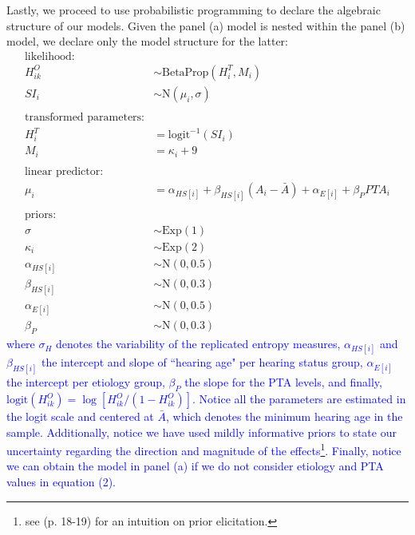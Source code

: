 Lastly, we proceed to use probabilistic programming to declare the algebraic structure of our models. Given the panel (a) model is nested within the panel (b) model, we declare only the model structure for the latter:
%
\begin{align}
	\text{likelihood:} & \nonumber \\
	H^{O}_{ik} & \sim \text{BetaProp} \left( H^{T}_{i}, M_{i} \right) \\ 
	SI_{i} & \sim \text{N} \left( \mu_{i}, \sigma \right) \\
	\nonumber \\
	\text{transformed parameters:} & \nonumber \\
	H^{T}_{i} &= \text{logit}^{-1}( SI_{i} ) \\
	M_{i} &= \kappa_{i} + 9 \\
	\nonumber \\
	\text{linear predictor:} & \nonumber \\
	\mu_{i} & = \alpha_{HS[i]} + \beta_{HS[i]} (A_{i} - \bar{A}) + \alpha_{E[i]} + \beta_{P} PTA_{i} \\ 
	\nonumber \\
	\text{priors:} & \nonumber \\
	\sigma & \sim \text{Exp}(1) \\
	\kappa_{i} & \sim \text{Exp}(2) \\
	\alpha_{HS[i]} & \sim \text{N}(0, 0.5) \\
	\beta_{HS[i]} & \sim \text{N}(0 , 0.3) \\
	\alpha_{E[i]} & \sim \text{N}(0, 0.5) \\
	\beta_{P} & \sim \text{N}(0, 0.3)
\end{align}
%
\textcolor{blue}{where $\sigma_{H}$ denotes the variability of the replicated entropy measures, $\alpha_{HS[i]}$ and $\beta_{HS[i]}$ the intercept and slope of ``hearing age" per hearing status group, $\alpha_{E[i]}$ the intercept per etiology group, $\beta_{P}$ the slope for the PTA levels, and finally, $\text{logit}\left( H^{O}_{ik} \right) = \log \left[ H^{O}_{ik} / ( 1 - H^{O}_{ik} ) \right]$. Notice all the parameters are estimated in the logit scale and centered at $\bar{A}$, which denotes the minimum hearing age in the sample. Additionally, notice we have used mildly informative priors to state our uncertainty regarding the direction and magnitude of the effects\footnote{see \citet{Rivera_2021} (p. 18-19) for an intuition on prior elicitation.}. Finally, notice we can obtain the model in panel (a) if we do not consider etiology and PTA values in equation (2).}
%
%
